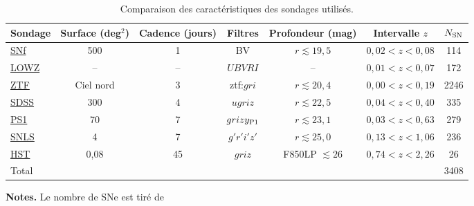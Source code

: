 \documentclass[../main/main.tex]{subfiles}
\begin{document}
\vfill
\shorthandoff{:}
\begin{table}[ht]
    \centerfloat
    \begin{threeparttable}
        \caption{Comparaison des caractéristiques des sondages utilisés.}
        \label{tab:sondcomp}
        \begin{tabular}{lcccccc}
            \toprule
            Sondage              &
            Surface (deg$^2$)    & Cadence (jours)   & Filtres          &
            Profondeur (mag)     & Intervalle $z$    & $N_{\rm SN}$\\
            \midrule
            \hyperref[sec:snf]{SNf}                      &
            500                      & 1                 & BV               &
            $r \lesssim 19,5$        & $0,02 < z < 0,08$ & 114\\
            \hyperref[sec:lowz]{LOWZ}\tnote{1}           &
            --                       & --                & $UBVRI$          &
            --                       & $0,01 < z < 0,07$ & 172\\
            \hyperref[sec:ztf]{ZTF}                      &
            Ciel nord                & 3                 & ztf:$gri$        &
            $r \lesssim 20,4$        & $0,00 < z < 0,19$ & 2246\\
            \hyperref[sec:sdss]{SDSS}                    &
            300                      & 4                 & $ugriz$          &
            $r \lesssim 22,5$        & $0,04 < z < 0,40$ & 335\\
            \hyperref[sec:ps1]{PS1}                      &
            70                       & 7                 & $grizy_{\rm P1}$ &
            $r \lesssim 23,1$        & $0,03 < z < 0,63$ & 279\\
            \hyperref[sec:snls]{SNLS}                    &
            4                        & 7                 & $g'r'i'z'$       &
            $r \lesssim 25,0$        & $0,13 < z < 1,06$ & 236\\
            \hyperref[sec:hst]{HST}\tnote{2}             &
            0,08                     & 45                & $griz$\tnote{3}  &
            F850LP $\lesssim 26$     & $0,74 < z < 2,26$ & 26\\
            \midrule
            Total & \multicolumn{5}{c}{} & 3408\tnote{4}\\
            \bottomrule
        \end{tabular}
        \begin{tablenotes}[flushleft]
        \item\small \textbf{\hspace{-3,2pt}Notes.} Le nombre de SNe est tiré de

\end{tablenotes}
\end{threeparttable}
\end{table}
\end{document}
